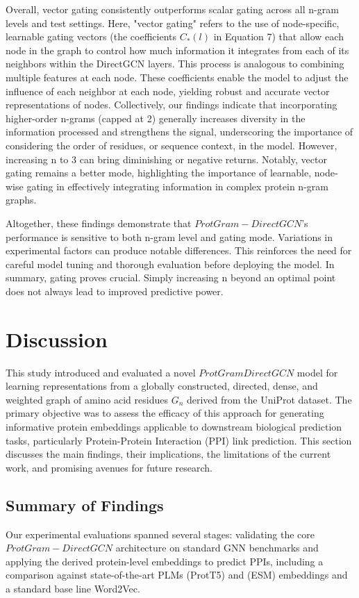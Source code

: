 \documentclass[utf8]{FrontiersinHarvard}
\begin{document}
Overall, vector gating consistently outperforms scalar gating across all n-gram levels and test settings. Here, "vector gating" refers to the use of node-specific, learnable gating vectors (the coefficients $C_{*}(l)$ in Equation 7) that allow each node in the graph to control how much information it integrates from each of its neighbors within the DirectGCN layers. This process is analogous to combining multiple features at each node. These coefficients enable the model to adjust the influence of each neighbor at each node, yielding robust and accurate vector representations of nodes. Collectively, our findings indicate that incorporating higher-order n-grams (capped at 2) generally increases diversity in the information processed and strengthens the signal, underscoring the importance of considering the order of residues, or sequence context, in the model. However, increasing n to 3 can bring diminishing or negative returns. Notably, vector gating remains a better mode, highlighting the importance of learnable, node-wise gating in effectively integrating information in complex protein n-gram graphs.

Altogether, these findings demonstrate that $ProtGram-DirectGCN$’s performance is sensitive to both n-gram level and gating mode. Variations in experimental factors can produce notable differences. This reinforces the need for careful model tuning and thorough evaluation before deploying the model. In summary, gating proves crucial. Simply increasing n beyond an optimal point does not always lead to improved predictive power.
	
	\section{Discussion}
	This study introduced and evaluated a novel $ProtGramDirectGCN$ model for learning representations from a globally constructed, directed, dense, and weighted graph of amino acid residues $G_{n}$ derived from the UniProt dataset. The primary objective was to assess the efficacy of this approach for generating informative protein embeddings applicable to downstream biological prediction tasks, particularly Protein-Protein Interaction (PPI) link prediction. This section discusses the main findings, their implications, the limitations of the current work, and promising avenues for future research.
	
	\subsection{Summary of Findings}
	Our experimental evaluations spanned several stages: validating the core $ProtGram-DirectGCN$ architecture on standard GNN benchmarks and applying the derived protein-level embeddings to predict PPIs, including a comparison against state-of-the-art PLMs (ProtT5) and (ESM) embeddings and a standard base line Word2Vec.
	
\end{document}
